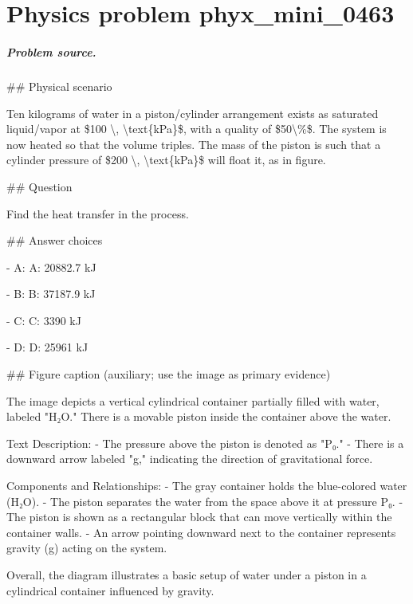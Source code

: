 
\chapter{Physics problem phyx\_mini\_0463}
\label{ch:PhyXMiniProblems_problem_phyx_mini_0463}

\paragraph{Problem source.}
\#\# Physical scenario

Ten kilograms of water in a piston/cylinder arrangement exists as saturated liquid/vapor at \$100 \textbackslash{}, \textbackslash{}text\{kPa\}\$, with a quality of \$50\textbackslash{}\%\$. The system is now heated so that the volume triples. The mass of the piston is such that a cylinder pressure of \$200 \textbackslash{}, \textbackslash{}text\{kPa\}\$ will float it, as in figure.

\#\# Question

Find the heat transfer in the process.

\#\# Answer choices

- A: A: 20882.7 kJ

- B: B: 37187.9 kJ

- C: C: 3390 kJ

- D: D: 25961 kJ

\#\# Figure caption (auxiliary; use the image as primary evidence)

The image depicts a vertical cylindrical container partially filled with water, labeled "H₂O." There is a movable piston inside the container above the water. 

Text Description:
- The pressure above the piston is denoted as "P₀."
- There is a downward arrow labeled "g," indicating the direction of gravitational force.

Components and Relationships:
- The gray container holds the blue-colored water (H₂O).
- The piston separates the water from the space above it at pressure P₀.
- The piston is shown as a rectangular block that can move vertically within the container walls.
- An arrow pointing downward next to the container represents gravity (g) acting on the system. 

Overall, the diagram illustrates a basic setup of water under a piston in a cylindrical container influenced by gravity.

